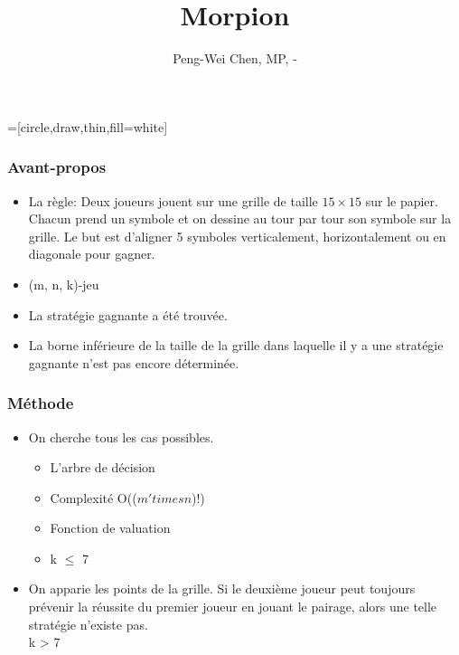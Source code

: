 \documentclass{beamer}
\title{Morpion}
\author{Peng-Wei Chen, MP, \oldstylenums{2017}-\oldstylenums{2018}}
\date{}
\begin{document}
=[circle,draw,thin,fill=white]

\begin{frame}
    \titlepage
\end{frame}

\begin{frame}
    \frametitle{Avant-propos}
    \begin{itemize}
        \item La règle:
Deux joueurs jouent sur une grille de taille $15 \times 15$ sur le papier. Chacun prend un symbole et on dessine au tour par tour son symbole sur la grille. Le but est d'aligner 5 symboles verticalement, horizontalement ou en diagonale pour gagner.
        \pause
        \item (m, n, k)-jeu
        \pause
        \item La stratégie gagnante a été trouvée.
        \item La borne inférieure de la taille de la grille dans laquelle il y a une stratégie gagnante n'est pas encore déterminée.
    \end{itemize}
    
\end{frame}


\begin{frame}
    \frametitle{Méthode}
    \begin{itemize}
        \item On cherche tous les cas possibles.
            \begin{itemize}
                \item L'arbre de décision
                \item Complexité O(($m 'times n$)!)
                \item{Fonction de valuation}
                \item k $\le$ 7
            \end{itemize}
        \item On apparie les points de la grille. Si le deuxième joueur peut toujours prévenir la réussite du premier joueur en jouant le pairage, alors une telle stratégie n'existe pas.\\
            k > 7

    \end{itemize}
\end{frame}
\end{document}
